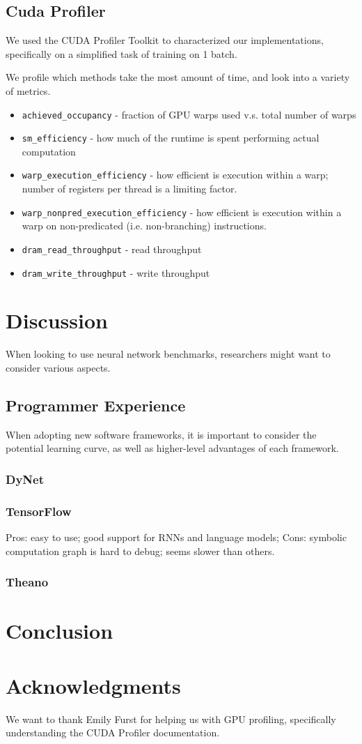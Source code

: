 \documentclass{article}
\begin{document}
\subsection{Cuda Profiler}
We used the CUDA Profiler Toolkit \cite{nvprof} to characterized our implementations, specifically on a simplified task of training on 1 batch.

We profile which methods take the most amount of time, and look into a variety of metrics.
\begin{itemize}
\item \verb!achieved_occupancy! - fraction of GPU warps used v.s. total number of warps
\item \verb!sm_efficiency! - how much of the runtime is spent performing actual computation
\item \verb!warp_execution_efficiency! - how efficient is execution within a warp; number of registers per thread is a limiting factor.
\item \verb!warp_nonpred_execution_efficiency! - how efficient is execution within a warp on non-predicated (i.e. non-branching) instructions.
\item \verb!dram_read_throughput! - read throughput
\item \verb!dram_write_throughput! - write throughput
\end{itemize}
\section{Discussion}
When looking to use neural network benchmarks, researchers might want to consider various aspects.
\subsection{Programmer Experience}
When adopting new software frameworks, it is important to consider the potential learning curve, as well as higher-level advantages of each framework.
\subsubsection{DyNet}

\subsubsection{TensorFlow}
Pros: easy to use; good support for RNNs and language models; 
Cons: symbolic computation graph is hard to debug; seems slower than others.
\subsubsection{Theano}
\section{Conclusion}


\section*{Acknowledgments}
We want to thank Emily Furst for helping us with GPU profiling, specifically understanding the CUDA Profiler documentation.
\newpage


\end{document}
